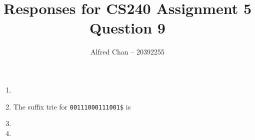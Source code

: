 \documentclass[12pt]{article}
\title{Responses for CS240 Assignment 5 Question 9}
\author{Alfred Chan -- 20392255}
\begin{document}
\maketitle
\begin{enumerate}
\item  \done
\item The suffix trie for \texttt{00111000111001\$} is
\done
\item
\done
\item
\done
\end{enumerate}
\end{document}
